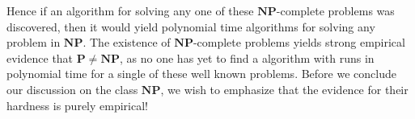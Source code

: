 Hence if an algorithm for solving any one of these $\mathbf{NP}$-complete problems was discovered, then it would yield polynomial time algorithms for solving any problem in $\mathbf{NP}$. The existence of $\mathbf{NP}$-complete problems yields strong empirical evidence that $\mathbf{P} \neq \mathbf{NP}$, as no one has yet to find a algorithm with runs in polynomial time for a single of these well known problems. Before we conclude our discussion on the class $\mathbf{NP}$, we wish to emphasize that the evidence for their hardness is purely empirical!

